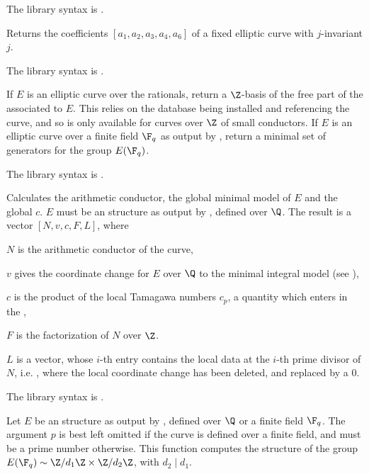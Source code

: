 The library syntax is .

\label{se:ellfromj}
Returns the coefficients $[a_1,a_2,a_3,a_4,a_6]$ of a fixed elliptic curve
with $j$-invariant $j$.

The library syntax is .

\label{se:ellgenerators}
If $E$ is an elliptic curve over the rationals, return a $\Z$-basis of the
free part of the  associated to $E$.  This relies on
the  database being installed and referencing the curve, and so
is only available for curves over $\Z$ of small conductors.
If $E$ is an elliptic curve over a finite field $\F_q$ as output by
, return a minimal set of generators for the group $E(\F_q)$.

The library syntax is .

\label{se:ellglobalred}
Calculates the arithmetic conductor, the global
minimal model of $E$ and the global  $c$.
$E$ must be an  structure as output by , defined over
$\Q$. The result is a vector $[N,v,c,F,L]$, where

\item $N$ is the arithmetic conductor of the curve,

\item $v$ gives the coordinate change for $E$ over $\Q$ to the minimal
integral model (see ),

\item $c$ is the product of the local Tamagawa numbers $c_p$, a quantity
which enters in the ,

\item $F$ is the factorization of $N$ over $\Z$.

\item $L$ is a vector, whose $i$-th entry contains the local data
at the $i$-th prime divisor of $N$, i.e. ,
where the local coordinate change has been deleted, and replaced by a $0$.

The library syntax is .

\label{se:ellgroup}
Let $E$ be an  structure as output by , defined over
$\Q$ or a finite field $\F_q$. The argument $p$ is best left omitted if the
curve is defined over a finite field, and must be a prime number otherwise.
This function computes the structure of the group $E(\F_q) \sim \Z/d_1\Z
\times \Z/d_2\Z$, with $d_2\mid d_1$.

